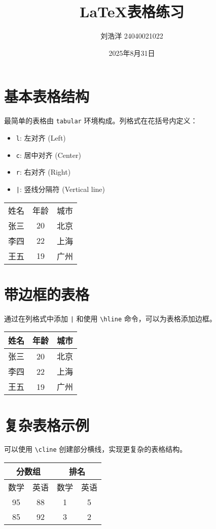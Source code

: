 \documentclass{article}
\title{LaTeX表格练习}
\author{刘浩洋 24040021022}
\date{2025年8月31日}
\begin{document}
\maketitle

\section{基本表格结构}
最简单的表格由 \texttt{tabular} 环境构成。列格式在花括号内定义：
\begin{itemize}
    \item \texttt{l}: 左对齐 (Left)
    \item \texttt{c}: 居中对齐 (Center)
    \item \texttt{r}: 右对齐 (Right)
    \item \texttt{|}: 竖线分隔符 (Vertical line)
\end{itemize}

\begin{tabular}{lcr}
姓名 & 年龄 & 城市 \\
张三 & 20 & 北京 \\
李四 & 22 & 上海 \\
王五 & 19 & 广州 \\
\end{tabular}

\section{带边框的表格}
通过在列格式中添加 \texttt{|} 和使用 \texttt{\textbackslash hline} 命令，可以为表格添加边框。

\begin{tabular}{|l|c|r|}
\hline
\textbf{姓名} & \textbf{年龄} & \textbf{城市} \\
\hline
张三 & 20 & 北京 \\
\hline
李四 & 22 & 上海 \\
\hline
王五 & 19 & 广州 \\
\hline
\end{tabular}

\section{复杂表格示例}
可以使用 \texttt{\textbackslash cline} 创建部分横线，实现更复杂的表格结构。

\begin{tabular}{|c|c|c|c|}
\hline
\multicolumn{2}{|c|}{\textbf{分数组}} & \multicolumn{2}{c|}{\textbf{排名}} \\
\hline
数学 & 英语 & 数学 & 英语 \\
\hline
95 & 88 & 1 & 5 \\
\cline{1-2}
85 & 92 & 3 & 2 \\
\hline
\end{tabular}

\end{document}
